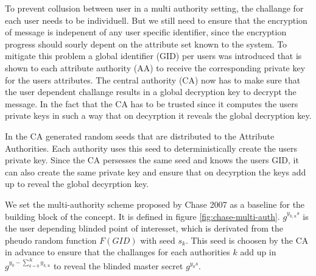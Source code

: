 \documentclass[twocolumn]{article}
\begin{document}
To prevent collusion between user in a multi authority setting, the challange for each user needs to be individuell. But we still need to ensure that the encryption of message is indepenent of any user specific identifier, since the encryption progress should sourly depent on the attribute set known to the system.
To mitigate this problem a global identifier (GID) per users was introduced that is shown to each attribute authority (AA) to receive the corresponding private key for the users attributes. 
The central authority (CA) now has to make sure that the user dependent challange results in a global decryption key to decrypt the message.
In the fact that the CA has to be trusted since it computes the users private keys in such a way that on decyrption it reveals the global decryption key. 

In \cite{case2007multi} the CA generated random seeds that are distributed to the Attribute Authorities. Each authority uses this seed to deterministically create the users private key. Since the CA persesses the same seed and knows the users GID, it can also create the same private key and ensure that on decyrption the keys add up to reveal the global decyrption key.

We set the multi-authority scheme proposed by Chase 2007 as a baseline for the building block of the concept. It is defined in figure \ref{fig:chase-multi-auth}. $g^{y_{k,u}s}$ is the user depending blinded point of interesset, which is derivated from the pheudo random function $F(GID)$ with seed $s_k$. This seed is choosen by the CA in advance to ensure that the challanges for each authorities $k$ add up in $g^{y_0 - \sum^K_{k=0} y_{k,u}}$ to reveal the blinded master secret $g^{y_0 s}$. 
\end{document}
